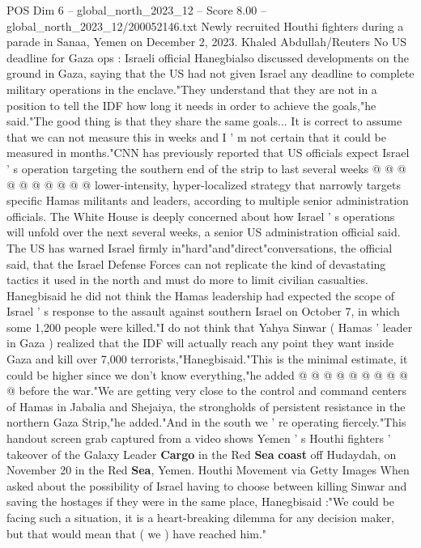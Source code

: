 \begin{textsample}{POS Dim 6 – global\_north\_2023\_12 – Score 8.00 – global\_north\_2023\_12/200052146.txt}
Newly recruited Houthi fighters during a parade in Sanaa, Yemen on December 2, 2023.
Khaled Abdullah/Reuters No US deadline for Gaza ops : Israeli official Hanegbialso discussed developments on the ground in Gaza, saying that the US had not given Israel any deadline to complete military operations in the enclave."They understand that they are not in a position to tell the IDF how long it needs in order to achieve the goals,"he said."The good thing is that they share the same goals...
It is correct to assume that we can not measure this in weeks and I ' m not certain that it could be measured in months."CNN has previously reported that US officials expect Israel ' s operation targeting the southern end of the strip to last several weeks @ @ @ @ @ @ @ @ @ @ lower-intensity, hyper-localized strategy that narrowly targets specific Hamas militants and leaders, according to multiple senior administration officials.
The White House is deeply concerned about how Israel ' s operations will unfold over the next several weeks, a senior US administration official said.
The US has warned Israel firmly in"hard"and"direct"conversations, the official said, that the Israel Defense Forces can not replicate the kind of devastating tactics it used in the north and must do more to limit civilian casualties.
Hanegbisaid he did not think the Hamas leadership had expected the scope of Israel ' s response to the assault against southern Israel on October 7, in which some 1,200 people were killed."I do not think that Yahya Sinwar ( Hamas ' leader in Gaza ) realized that the IDF will actually reach any point they want inside Gaza and kill over 7,000 terrorists,"Hanegbisaid."This is the minimal estimate, it could be higher since we don't know everything,"he added @ @ @ @ @ @ @ @ @ @ before the war."We are getting very close to the control and command centers of Hamas in Jabalia and Shejaiya, the strongholds of persistent resistance in the northern Gaza Strip,"he added."And in the south we ' re operating fiercely."This handout screen grab captured from a video shows Yemen ' s Houthi fighters ' takeover of the Galaxy Leader \textbf{Cargo} in the Red \textbf{Sea} \textbf{coast} off Hudaydah, on November 20 in the Red \textbf{Sea}, Yemen.
Houthi Movement via Getty Images When asked about the possibility of Israel having to choose between killing Sinwar and saving the hostages if they were in the same place, Hanegbisaid :"We could be facing such a situation, it is a heart-breaking dilemma for any decision maker, but that would mean that ( we ) have reached him."

\end{textsample}
